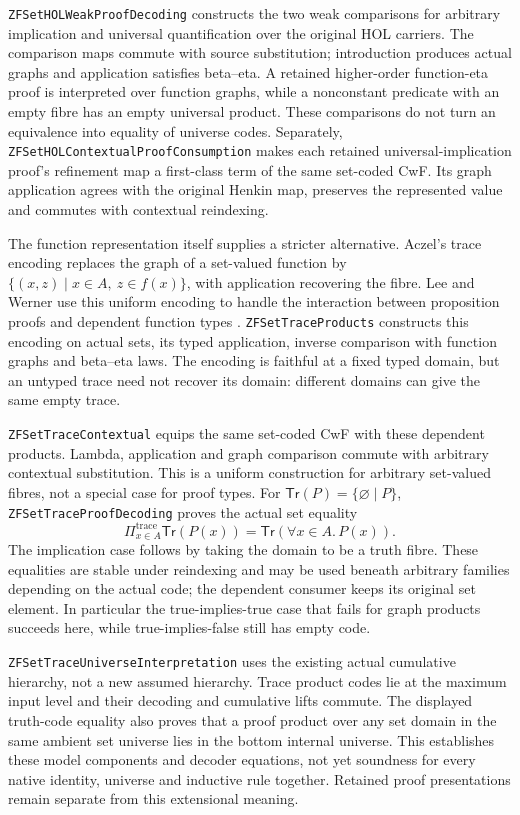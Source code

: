 \documentclass[11pt]{article}
\theoremstyle{definition}
\theoremstyle{remark}
\begin{document}
\nolinkurl{ZFSetHOLWeakProofDecoding} constructs the two weak comparisons
for arbitrary implication and universal quantification over the original
HOL carriers. The comparison maps commute with source substitution;
introduction produces actual graphs and application satisfies beta--eta.
A retained higher-order function-eta proof is interpreted over function
graphs, while a nonconstant predicate with an empty fibre has an empty
universal product. These comparisons do not turn an equivalence into
equality of universe codes. Separately,
\nolinkurl{ZFSetHOLContextualProofConsumption} makes each retained
universal-implication proof's refinement map a first-class term of the same
set-coded CwF. Its graph application agrees with the original Henkin map,
preserves the represented value and commutes with contextual reindexing.

The function representation itself supplies a stricter alternative.
Aczel's trace encoding replaces the graph of a set-valued function by
\(\{(x,z)\mid x\in A,\ z\in f(x)\}\), with application recovering
the fibre. Lee and Werner use this uniform encoding to handle the
interaction between proposition proofs and dependent function types
\cite{LeeWernerTraceModel}. \nolinkurl{ZFSetTraceProducts} constructs
this encoding on actual sets, its typed application, inverse comparison
with function graphs and beta--eta laws. The encoding is faithful at a
fixed typed domain, but an untyped trace need not recover its domain:
different domains can give the same empty trace.

\nolinkurl{ZFSetTraceContextual} equips the same set-coded CwF with
these dependent products. Lambda, application and graph comparison commute
with arbitrary contextual substitution. This is a uniform construction
for arbitrary set-valued fibres, not a special case for proof types.
For \(\mathsf{Tr}(P)=\{\varnothing\mid P\}\),
\nolinkurl{ZFSetTraceProofDecoding} proves the actual set equality
\[
 \Pi^{\mathrm{trace}}_{x\in A}\mathsf{Tr}(P(x))
   =\mathsf{Tr}(\forall x\in A.\,P(x)).
\]
The implication case follows by taking the domain to be a truth fibre.
These equalities are stable under reindexing and may be used beneath
arbitrary families depending on the actual code; the dependent consumer
keeps its original set element. In particular the true-implies-true case
that fails for graph products succeeds here, while true-implies-false
still has empty code.

\nolinkurl{ZFSetTraceUniverseInterpretation} uses the existing actual
cumulative hierarchy, not a new assumed hierarchy. Trace product codes
lie at the maximum input level and their decoding and cumulative lifts
commute. The displayed truth-code equality also proves that a proof
product over any set domain in the same ambient set universe lies in the
bottom internal universe.
This establishes these model components and decoder equations, not yet
soundness for every native identity, universe and inductive rule together.
Retained proof presentations remain separate from this extensional meaning.
\end{document}
